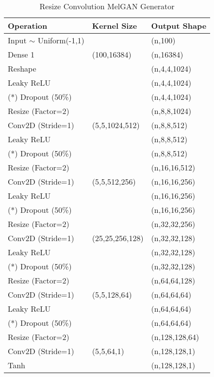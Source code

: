 \begin{table}[H]
\caption{Resize Convolution MelGAN Generator}\label{melgan_gen}
\centering
\begin{tabular}{l|l|l}
Operation & Kernel Size & Output Shape \\ \hline
Input $\sim$ Uniform(-1,1) & \  & (n,100)\\
Dense 1 & (100,16384) & (n,16384)\\
Reshape & \ & (n,4,4,1024)\\
Leaky ReLU & \ & (n,4,4,1024)\\
(*) Dropout (50\%) & \ & (n,4,4,1024)\\
Resize (Factor=2) & \ & (n,8,8,1024)\\
Conv2D (Stride=1) & (5,5,1024,512) & (n,8,8,512)\\
Leaky ReLU & \  & (n,8,8,512)\\
(*) Dropout (50\%) & \  & (n,8,8,512)\\
Resize (Factor=2) & \ & (n,16,16,512)\\
Conv2D (Stride=1) & (5,5,512,256) & (n,16,16,256)\\
Leaky ReLU & \  & (n,16,16,256)\\
(*) Dropout (50\%) & \  & (n,16,16,256)\\
Resize (Factor=2) & \ & (n,32,32,256)\\
Conv2D (Stride=1) & (25,25,256,128) & (n,32,32,128)\\
Leaky ReLU & \  & (n,32,32,128)\\
(*) Dropout (50\%) & \  & (n,32,32,128)\\
Resize (Factor=2) & \ & (n,64,64,128)\\
Conv2D (Stride=1) & (5,5,128,64) & (n,64,64,64)\\
Leaky ReLU & \  & (n,64,64,64)\\
(*) Dropout (50\%) & \  & (n,64,64,64)\\
Resize (Factor=2) & \ & (n,128,128,64)\\
Conv2D (Stride=1) & (5,5,64,1) & (n,128,128,1)\\
Tanh & \  & (n,128,128,1)\\
\end{tabular}
\end{table}


